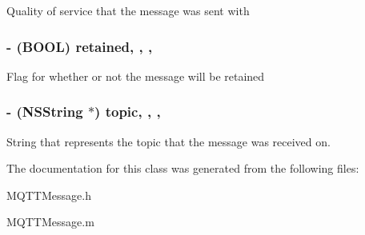 Quality of service that the message was sent with \hypertarget{interface_m_q_t_t_message_aa7649c2ce6f7722f8038396744669389}{
\subsubsection[{retained}]{\setlength{\rightskip}{0pt plus 5cm}-\/ (B\-O\-O\-L) retained\hspace{0.3cm}{\ttfamily [read]}, {\ttfamily [write]}, {\ttfamily [atomic]}, {\ttfamily [assign]}}}\label{interface_m_q_t_t_message_aa7649c2ce6f7722f8038396744669389}
Flag for whether or not the message will be retained \hypertarget{interface_m_q_t_t_message_aea41fbd478102a49878498376a273705}{
\subsubsection[{topic}]{\setlength{\rightskip}{0pt plus 5cm}-\/ (N\-S\-String $\ast$) topic\hspace{0.3cm}{\ttfamily [read]}, {\ttfamily [write]}, {\ttfamily [atomic]}, {\ttfamily [retain]}}}\label{interface_m_q_t_t_message_aea41fbd478102a49878498376a273705}
String that represents the topic that the message was received on. 

The documentation for this class was generated from the following files\-:\begin{DoxyCompactItemize}
\item 
M\-Q\-T\-T\-Message.\-h\item 
M\-Q\-T\-T\-Message.\-m\end{DoxyCompactItemize}
